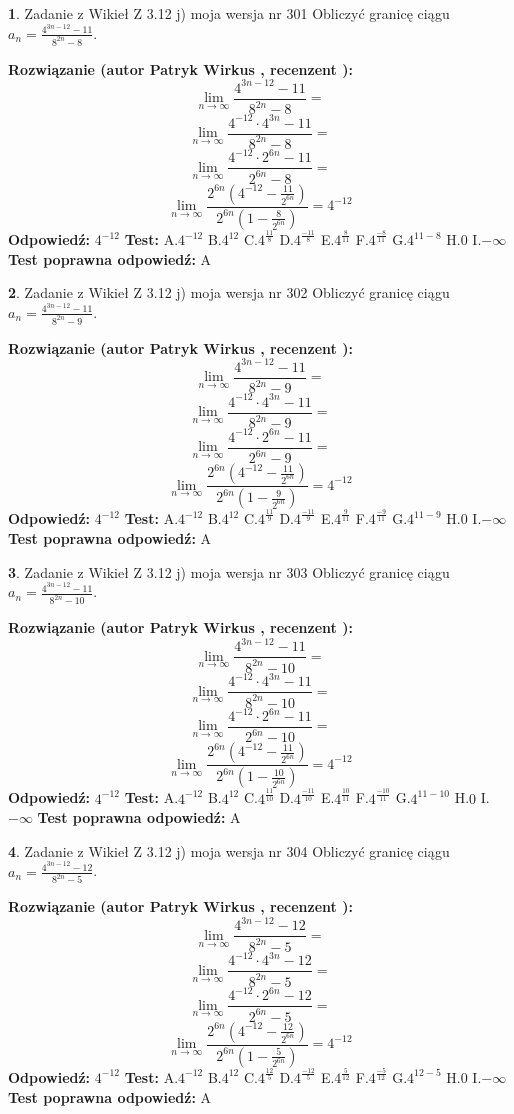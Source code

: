 \documentclass[12pt, a4paper]{article}
\theoremstyle{definition} %
\newtheorem{zad}{}
\newcommand{\zadStart}[1]{\begin{zad}#1\newline}
\newcommand{\zadStop}{\end{zad}}
\newcommand{\rozwStart}[2]{\noindent \textbf{Rozwiązanie (autor #1 , recenzent #2): }\newline}
\newcommand{\rozwStop}{\newline}
\newcommand{\odpStart}{\noindent \textbf{Odpowiedź:}\newline}
\newcommand{\odpStop}{\newline}
\newcommand{\testStart}{\noindent \textbf{Test:}\newline}
\newcommand{\testStop}{\newline}
\newcommand{\kluczStart}{\noindent \textbf{Test poprawna odpowiedź:}\newline}
\newcommand{\kluczStop}{\newline}
\begin{document}
\zadStart{Zadanie z Wikieł Z 3.12 j) moja wersja nr 301}
Obliczyć granicę ciągu $a_{n}=\frac{4^{3n-12}-11}{8^{2n}-8}$.
\zadStop
\rozwStart{Patryk Wirkus}{}
$$\lim\limits_{n\to\infty}\frac{4^{3n-12}-11}{8^{2n}-8}=$$
$$\lim\limits_{n\to\infty}\frac{4^{-12} \cdot 4^{3n}-11}{8^{2n}-8}=$$
$$\lim\limits_{n\to\infty}\frac{4^{-12} \cdot 2^{6n}-11}{2^{6n}-8}=$$
$$\lim\limits_{n\to\infty}\frac{2^{6n}(4^{-12} - \frac{11}{2^{6n}})}{2^{6n}(1-\frac{8}{2^{6n}})}= 4^{-12}$$
\rozwStop
\odpStart
$4^{-12}$
\odpStop
\testStart
A.$4^{-12}$
B.$4^{12}$
C.$4^{\frac{11}{8}}$
D.$4^{\frac{-11}{8}}$
E.$4^{\frac{8}{11}}$
F.$4^{\frac{-8}{11}}$
G.$4^{11-8}$
H.$0$
I.$-\infty$
\testStop
\kluczStart
A
\kluczStop



\zadStart{Zadanie z Wikieł Z 3.12 j) moja wersja nr 302}
Obliczyć granicę ciągu $a_{n}=\frac{4^{3n-12}-11}{8^{2n}-9}$.
\zadStop
\rozwStart{Patryk Wirkus}{}
$$\lim\limits_{n\to\infty}\frac{4^{3n-12}-11}{8^{2n}-9}=$$
$$\lim\limits_{n\to\infty}\frac{4^{-12} \cdot 4^{3n}-11}{8^{2n}-9}=$$
$$\lim\limits_{n\to\infty}\frac{4^{-12} \cdot 2^{6n}-11}{2^{6n}-9}=$$
$$\lim\limits_{n\to\infty}\frac{2^{6n}(4^{-12} - \frac{11}{2^{6n}})}{2^{6n}(1-\frac{9}{2^{6n}})}= 4^{-12}$$
\rozwStop
\odpStart
$4^{-12}$
\odpStop
\testStart
A.$4^{-12}$
B.$4^{12}$
C.$4^{\frac{11}{9}}$
D.$4^{\frac{-11}{9}}$
E.$4^{\frac{9}{11}}$
F.$4^{\frac{-9}{11}}$
G.$4^{11-9}$
H.$0$
I.$-\infty$
\testStop
\kluczStart
A
\kluczStop



\zadStart{Zadanie z Wikieł Z 3.12 j) moja wersja nr 303}
Obliczyć granicę ciągu $a_{n}=\frac{4^{3n-12}-11}{8^{2n}-10}$.
\zadStop
\rozwStart{Patryk Wirkus}{}
$$\lim\limits_{n\to\infty}\frac{4^{3n-12}-11}{8^{2n}-10}=$$
$$\lim\limits_{n\to\infty}\frac{4^{-12} \cdot 4^{3n}-11}{8^{2n}-10}=$$
$$\lim\limits_{n\to\infty}\frac{4^{-12} \cdot 2^{6n}-11}{2^{6n}-10}=$$
$$\lim\limits_{n\to\infty}\frac{2^{6n}(4^{-12} - \frac{11}{2^{6n}})}{2^{6n}(1-\frac{10}{2^{6n}})}= 4^{-12}$$
\rozwStop
\odpStart
$4^{-12}$
\odpStop
\testStart
A.$4^{-12}$
B.$4^{12}$
C.$4^{\frac{11}{10}}$
D.$4^{\frac{-11}{10}}$
E.$4^{\frac{10}{11}}$
F.$4^{\frac{-10}{11}}$
G.$4^{11-10}$
H.$0$
I.$-\infty$
\testStop
\kluczStart
A
\kluczStop



\zadStart{Zadanie z Wikieł Z 3.12 j) moja wersja nr 304}
Obliczyć granicę ciągu $a_{n}=\frac{4^{3n-12}-12}{8^{2n}-5}$.
\zadStop
\rozwStart{Patryk Wirkus}{}
$$\lim\limits_{n\to\infty}\frac{4^{3n-12}-12}{8^{2n}-5}=$$
$$\lim\limits_{n\to\infty}\frac{4^{-12} \cdot 4^{3n}-12}{8^{2n}-5}=$$
$$\lim\limits_{n\to\infty}\frac{4^{-12} \cdot 2^{6n}-12}{2^{6n}-5}=$$
$$\lim\limits_{n\to\infty}\frac{2^{6n}(4^{-12} - \frac{12}{2^{6n}})}{2^{6n}(1-\frac{5}{2^{6n}})}= 4^{-12}$$
\rozwStop
\odpStart
$4^{-12}$
\odpStop
\testStart
A.$4^{-12}$
B.$4^{12}$
C.$4^{\frac{12}{5}}$
D.$4^{\frac{-12}{5}}$
E.$4^{\frac{5}{12}}$
F.$4^{\frac{-5}{12}}$
G.$4^{12-5}$
H.$0$
I.$-\infty$
\testStop
\kluczStart
A
\kluczStop
\end{document}
